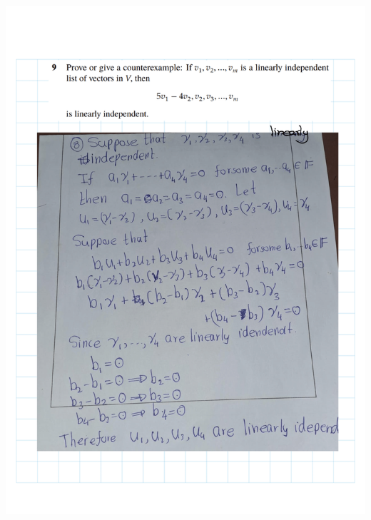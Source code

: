 \documentclass[
]{book}
\theoremstyle{definition}
\theoremstyle{definition}
\theoremstyle{definition}
\theoremstyle{definition}
\theoremstyle{remark}
\begin{document}
\includegraphics{fig/Ex2A/Ex2A-11.png}
\end{document}
